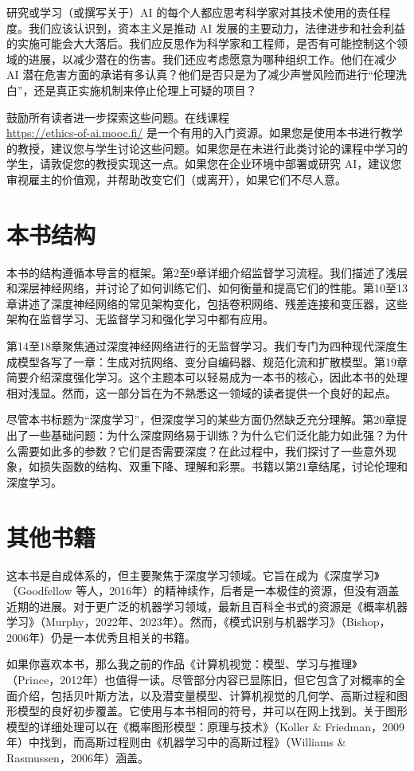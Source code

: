 研究或学习（或撰写关于）AI 的每个人都应思考科学家对其技术使用的责任程度。我们应该认识到，资本主义是推动 AI 发展的主要动力，法律进步和社会利益的实施可能会大大落后。我们应反思作为科学家和工程师，是否有可能控制这个领域的进展，以减少潜在的伤害。我们还应考虑愿意为哪种组织工作。他们在减少 AI 潜在危害方面的承诺有多认真？他们是否只是为了减少声誉风险而进行“伦理洗白”，还是真正实施机制来停止伦理上可疑的项目？


鼓励所有读者进一步探索这些问题。在线课程 \\
\url{https://ethics-of-ai.mooc.fi/} 是一个有用的入门资源。如果您是使用本书进行教学的教授，建议您与学生讨论这些问题。如果您是在未进行此类讨论的课程中学习的学生，请敦促您的教授实现这一点。如果您在企业环境中部署或研究 AI，建议您审视雇主的价值观，并帮助改变它们（或离开），如果它们不尽人意。

\section{本书结构}
本书的结构遵循本导言的框架。第2至9章详细介绍监督学习流程。我们描述了浅层和深层神经网络，并讨论了如何训练它们、如何衡量和提高它们的性能。第10至13章讲述了深度神经网络的常见架构变化，包括卷积网络、残差连接和变压器，这些架构在监督学习、无监督学习和强化学习中都有应用。

第14至18章聚焦通过深度神经网络进行的无监督学习。我们专门为四种现代深度生成模型各写了一章：生成对抗网络、变分自编码器、规范化流和扩散模型。第19章简要介绍深度强化学习。这个主题本可以轻易成为一本书的核心，因此本书的处理相对浅显。然而，这一部分旨在为不熟悉这一领域的读者提供一个良好的起点。

尽管本书标题为“深度学习”，但深度学习的某些方面仍然缺乏充分理解。第20章提出了一些基础问题：为什么深度网络易于训练？为什么它们泛化能力如此强？为什么需要如此多的参数？它们是否需要深度？在此过程中，我们探讨了一些意外现象，如损失函数的结构、双重下降、理解和彩票。书籍以第21章结尾，讨论伦理和深度学习。
\section{其他书籍}
这本书是自成体系的，但主要聚焦于深度学习领域。它旨在成为《深度学习》（Goodfellow 等人，2016年）的精神续作，后者是一本极佳的资源，但没有涵盖近期的进展。对于更广泛的机器学习领域，最新且百科全书式的资源是《概率机器学习》（Murphy，2022年、2023年）。然而，《模式识别与机器学习》（Bishop，2006年）仍是一本优秀且相关的书籍。

如果你喜欢本书，那么我之前的作品《计算机视觉：模型、学习与推理》（Prince，2012年）也值得一读。尽管部分内容已显陈旧，但它包含了对概率的全面介绍，包括贝叶斯方法，以及潜变量模型、计算机视觉的几何学、高斯过程和图形模型的良好初步覆盖。它使用与本书相同的符号，并可以在网上找到。关于图形模型的详细处理可以在《概率图形模型：原理与技术》（Koller \& Friedman，2009年）中找到，而高斯过程则由《机器学习中的高斯过程》（Williams \& Rasmussen，2006年）涵盖。

